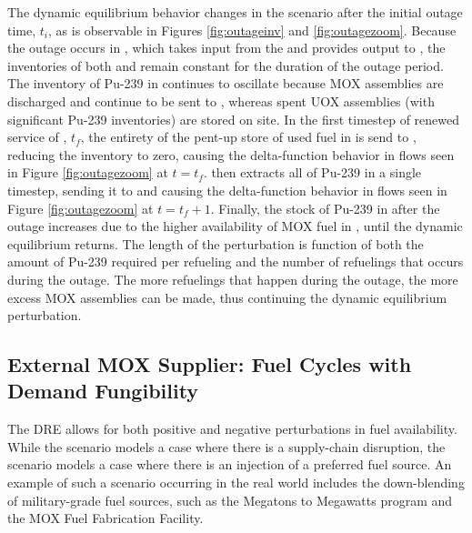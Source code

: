 The dynamic equilibrium behavior changes in the \outage scenario after the
initial outage time, $t_i$, as is observable in Figures \ref{fig:outageinv} and
\ref{fig:outagezoom}. Because the outage occurs in \separations, which takes
input from the \reactors and provides output to \fabrication, the inventories of
both \separations and \fabrication remain constant for the duration of the
outage period. The inventory of Pu-239 in \reactors continues to oscillate
because MOX assemblies are discharged and continue to be sent to \storage,
whereas spent UOX assemblies (with significant Pu-239 inventories) are stored on
site. In the first timestep of renewed service of \separations, $t_f$, the
entirety of the pent-up store of used fuel in \reactors is send to \separations,
reducing the inventory to zero, causing the delta-function behavior in \reactor
flows seen in Figure \ref{fig:outagezoom} at $t = t_f$. \separations then
extracts all of Pu-239 in a single timestep, sending it to \fabrication and
causing the delta-function behavior in \separations flows seen in Figure
\ref{fig:outagezoom} at $t = t_f + 1$. Finally, the stock of Pu-239 in \reactors
after the outage increases due to the higher availability of MOX fuel in
\fabrication, until the dynamic equilibrium returns. The length of the
perturbation is function of both the amount of Pu-239 required per refueling and
the number of refuelings that occurs during the outage. The more refuelings that
happen during the outage, the more excess MOX assemblies can be made, thus
continuing the dynamic equilibrium perturbation.

\subsection{External MOX Supplier: Fuel Cycles with Demand Fungibility}

The DRE allows for both positive and negative perturbations in fuel
availability. While the \outage scenario models a case where there is a
supply-chain disruption, the \external scenario models a case where
there is an injection of a preferred fuel source. An example of such a scenario
occurring in the real world includes the down-blending of military-grade fuel
sources, such as the Megatons to Megawatts program and the MOX Fuel Fabrication
Facility.

